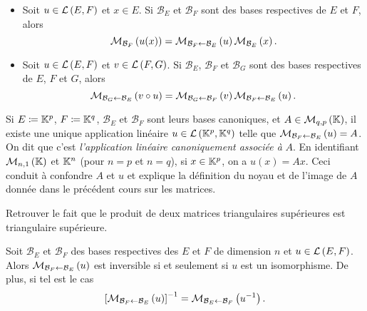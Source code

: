 \documentclass{magnolia}
\begin{document}
\begin{proposition}[utile=-3]
$\quad$
\begin{itemize}
\item Soit $u\in\mathcal{L}\left(E,F\right)$ et $x\in E$. Si $\mathcal{B}_E$ et $\mathcal{B}_F$ sont
  des bases respectives de $E$ et $F$, alors
  \[\mathcal{M}_{\mathcal{B}_F}\left(u(x)\right)=\mathcal{M}_{\mathcal{B}_F\gets\mathcal{B}_E}\left(u\right)
    \mathcal{M}_{\mathcal{B}_E}\left(x\right).\]
\item Soit $u\in\mathcal{L}\left(E,F\right)$ et $v\in\mathcal{L}\left(F,G\right)$. Si $\mathcal{B}_E$,
  $\mathcal{B}_F$ et $\mathcal{B}_G$ sont des bases respectives de $E$, $F$ et $G$,
  alors
  \[\mathcal{M}_{\mathcal{B}_G\gets\mathcal{B}_E}\left(v\circ u\right)=
    \mathcal{M}_{\mathcal{B}_G\gets\mathcal{B}_F}\left(v\right)
    \mathcal{M}_{\mathcal{B}_F\gets\mathcal{B}_E}\left(u\right).\]
\end{itemize}
\end{proposition}

\begin{remarqueUnique}
\remarque Si $E\coloneqq\mathbb{K}^p$,
  $F\coloneqq\mathbb{K}^q$, $\mathcal{B}_E$ et $\mathcal{B}_F$ sont leurs bases canoniques,
  et $A\in\mathcal{M}_{q,p}\left(\mathbb{K}\right)$,
  il existe une unique application linéaire $u\in\mathcal{L}\left(\mathbb{K}^p,\mathbb{K}^q\right)$
  telle que $\mathcal{M}_{\mathcal{B}_F\gets\mathcal{B}_E}\left(u\right)=A$. On dit que c'est
  \emph{l'application linéaire canoniquement associée à} $A$. En identifiant
  $\mathcal{M}_{n,1}\left(\mathbb{K}\right)$ et $\mathbb{K}^n$ (pour $n=p$ et $n=q$), si $x\in\mathbb{K}^p$, on a
  $u(x)=Ax$. Ceci conduit à confondre $A$ et $u$ et explique la définition
  du noyau et de l'image de $A$ donnée dans le précédent cours sur les matrices.
\end{remarqueUnique}

\begin{exoUnique}
\exo Retrouver le fait que le produit de deux matrices triangulaires
  supérieures est triangulaire supérieure.  
\end{exoUnique}

\begin{proposition}[utile=-3]
Soit $\mathcal{B}_E$ et $\mathcal{B}_F$ des bases respectives des \Kevs $E$ et $F$
de dimension $n$ et $u\in\mathcal{L}\left(E,F\right)$. Alors $\mathcal{M}_{\mathcal{B}_F\gets\mathcal{B}_E}\left(u\right)$ est
inversible si et seulement si $u$ est un isomorphisme. De plus, si
tel est le cas
\[\left[\mathcal{M}_{\mathcal{B}_F\gets\mathcal{B}_E}\left(u\right)\right]^{-1}=\mathcal{M}_{\mathcal{B}_E\gets\mathcal{B}_F}\left(u^{-1}\right).\]
\end{proposition}
\end{document}
